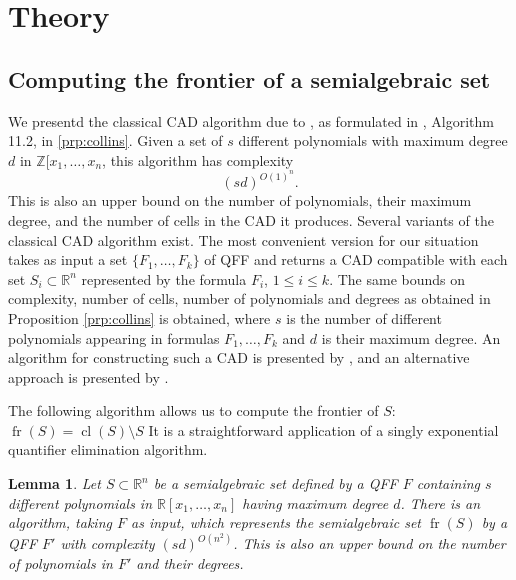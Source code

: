 \documentclass[
]{book}
\newtheorem{lemma}{Lemma}[chapter]
\theoremstyle{definition}
\theoremstyle{definition}
\theoremstyle{definition}
\theoremstyle{definition}
\theoremstyle{remark}
\begin{document}
\hypertarget{theory}{%
\section{Theory}\label{theory}}

\hypertarget{sec:novel-frontier-fr}{%
\subsection{Computing the frontier of a semialgebraic set}\label{sec:novel-frontier-fr}}

We presentd the classical CAD algorithm due to \citet{collins1975}, as formulated in \citet{bpr2006}, Algorithm 11.2, in \ref{prp:collins}.
Given a set of \(s\) different polynomials with maximum degree \(d\) in \(\mathbb{Z}[x_1,\ldots,x_n\), this algorithm has complexity
\[
(sd)^{O(1)^{n}}.
\]
This is also an upper bound on the number of polynomials, their maximum degree, and the number of cells in the CAD it produces.
Several variants of the classical CAD algorithm exist. The most convenient version for our situation takes as input a set \(\{ F_1,\ldots,F_k \}\) of QFF and returns a CAD compatible with each set \(S_i \subset \mathbb{R}^n\) represented by the formula \(F_i\), \(1 \le i \le k\). The same bounds on complexity, number of cells, number of polynomials and degrees as obtained in Proposition \ref{prp:collins} is obtained, where \(s\) is the number of different polynomials appearing in formulas \(F_1,\ldots,F_k\) and \(d\) is their maximum degree.
An algorithm for constructing such a CAD is presented by \citet{collins1991}, and an alternative approach is presented by \citet{bradford2014}.

The following algorithm allows us to compute the frontier of \(S\): \({\operatorname{fr} \left( S \right)}={\operatorname{cl} \left( S \right)} \setminus S\)
It is a straightforward application of a singly exponential quantifier elimination algorithm.

\begin{lemma}
\protect\hypertarget{lem:frontier}{}\label{lem:frontier}Let \(S \subset \mathbb{R}^n\) be a semialgebraic set defined by a QFF \(F\)
containing \(s\) different polynomials in \(\mathbb{R}[x_1, \ldots ,x_n]\) having maximum degree \(d\).
There is an algorithm, taking \(F\) as input, which represents the semialgebraic set \({\operatorname{fr} \left( S \right)}\) by a QFF \(F'\) with complexity \((sd)^{O(n^2)}\).
This is also an upper bound on the number of polynomials in \(F'\) and their degrees.
\end{lemma}
\end{document}
